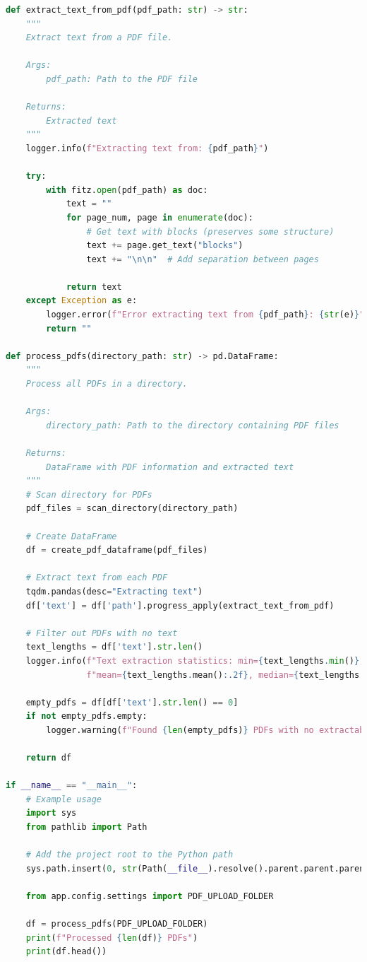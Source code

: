 \documentclass[
  screen,review,acmlarge]{acmart}
\begin{document}
\begin{lstlisting}[language=Python]
def extract_text_from_pdf(pdf_path: str) -> str:
    """
    Extract text from a PDF file.
    
    Args:
        pdf_path: Path to the PDF file
        
    Returns:
        Extracted text
    """
    logger.info(f"Extracting text from: {pdf_path}")
    
    try:
        with fitz.open(pdf_path) as doc:
            text = ""
            for page_num, page in enumerate(doc):
                # Get text with blocks (preserves some structure)
                text += page.get_text("blocks")
                text += "\n\n"  # Add separation between pages
                
            return text
    except Exception as e:
        logger.error(f"Error extracting text from {pdf_path}: {str(e)}")
        return ""

def process_pdfs(directory_path: str) -> pd.DataFrame:
    """
    Process all PDFs in a directory.
    
    Args:
        directory_path: Path to the directory containing PDF files
        
    Returns:
        DataFrame with PDF information and extracted text
    """
    # Scan directory for PDFs
    pdf_files = scan_directory(directory_path)
    
    # Create DataFrame
    df = create_pdf_dataframe(pdf_files)
    
    # Extract text from each PDF
    tqdm.pandas(desc="Extracting text")
    df['text'] = df['path'].progress_apply(extract_text_from_pdf)
    
    # Filter out PDFs with no text
    text_lengths = df['text'].str.len()
    logger.info(f"Text extraction statistics: min={text_lengths.min()}, max={text_lengths.max()}, "
                f"mean={text_lengths.mean():.2f}, median={text_lengths.median()}")
    
    empty_pdfs = df[df['text'].str.len() == 0]
    if not empty_pdfs.empty:
        logger.warning(f"Found {len(empty_pdfs)} PDFs with no extractable text")
    
    return df

if __name__ == "__main__":
    # Example usage
    import sys
    from pathlib import Path
    
    # Add the project root to the Python path
    sys.path.insert(0, str(Path(__file__).resolve().parent.parent.parent))
    
    from app.config.settings import PDF_UPLOAD_FOLDER
    
    df = process_pdfs(PDF_UPLOAD_FOLDER)
    print(f"Processed {len(df)} PDFs")
    print(df.head())
\end{lstlisting}
\end{document}
